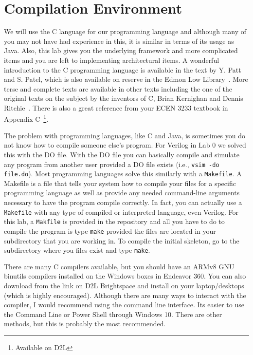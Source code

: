 \documentclass{article}
\begin{document}
\section{Compilation Environment}

We will use the C language for our programming language and although
many of you may not have had experience in this, it is similar in
terms of its usage as Java.  Also, this lab gives you the underlying
framework and more complicated items and you are left to implementing
architectural items.  A wonderful introduction to the C
programming language is available in the text by Y. Patt and S. Patel,
which is also available on reserve in the Edmon Low
Library~\cite{Patt:2003:ICS:861709}.  More terse and complete texts
are available in other texts including the one of the original texts
on the subject by the inventors of C, Brian Kernighan and
Dennis Ritchie~\cite{Kernighan:1978:CPL:7519}.   There is also a great
reference from your ECEN 3233 textbook in Appendix
C~\cite{Harris:2015:DDC:2815529}\footnote{Available on D2L}. 

The problem with programming languages, like C and Java, is sometimes
you do not know how to compile someone else's program.  For Verilog in
Lab 0 we solved this with the DO file.  With the DO file you can
basically compile and simulate any program from another user provided
a DO file exists (i.e., \verb+vsim -do file.do+).  Most programming
languages solve this similarly
with a \verb+Makefile+.  A Makefile is a file that tells your system how to
compile your files for a specific programming language as well as
provide any needed command-line arguments necessary to have the
program compile correctly.  In fact, you can actually use a
\verb+Makefile+ with any type of compiled or interpreted language,
even Verilog. For this lab, a
\verb+Makfile+ is provided in the repository 
and all you have to do to compile the
program is type \verb+make+ provided the files are located in your
subdirectory that you are working in.  To compile the initial
skeleton, go to the subdirectory where you files exist and type
\verb+make+.  

There are many C compilers available, but you should have an ARMv8 GNU
binutils compilers installed on the Windows boxes in Endeavor 360.
You can also download from the link on D2L Brightspace and install on your
laptop/desktops (which is highly encouraged).  Although there are many
ways to interact with the compiler, I would recommend using the
command line interface.  Its easier to use the Command Line or Power
Shell through Windows 10.  There are other methods, but this is
probably the most recommended.  
\end{document}
